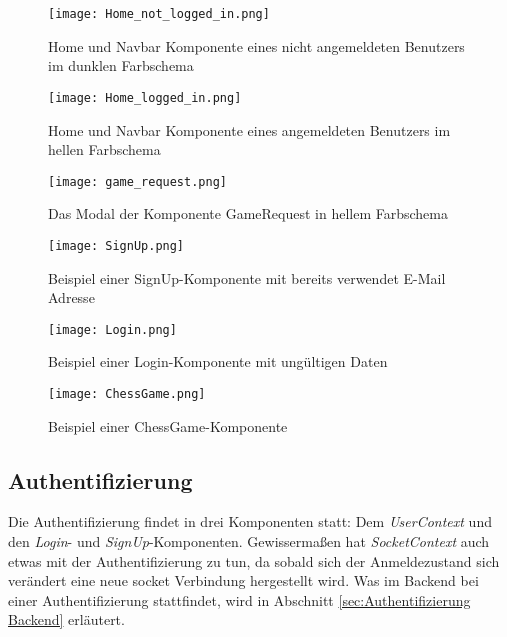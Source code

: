   \begin{figure}[htbp]
  \centering
  \texttt{[image: Home\_not\_logged\_in.png]}
  \caption{Home und Navbar Komponente eines nicht angemeldeten Benutzers im dunklen Farbschema}
  \label{fig:home-not-logged-in}
\end{figure}

  
    \begin{figure}[htbp]
    \centering
  \texttt{[image: Home\_logged\_in.png]}
  \caption{Home und Navbar Komponente eines angemeldeten Benutzers im hellen Farbschema}
  \label{fig:home-logged-in}
\end{figure}

      \begin{figure}[htbp]
      \centering
  \texttt{[image: game\_request.png]}
  \caption{Das Modal der Komponente GameRequest in hellem Farbschema}
  \label{fig:game-request}
\end{figure}

      \begin{figure}[htbp]
      \centering
  \texttt{[image: SignUp.png]}
  \caption{Beispiel einer SignUp-Komponente mit bereits verwendet E-Mail Adresse} 
  \label{fig:SignUp}
\end{figure}

      \begin{figure}[htbp]
      \centering
  \texttt{[image: Login.png]}
  \caption{Beispiel einer Login-Komponente mit ungültigen Daten} 
  \label{fig:Login}
\end{figure}

      \begin{figure}[htbp]
      \centering
  \texttt{[image: ChessGame.png]}
  \caption{Beispiel einer ChessGame-Komponente} 
  \label{fig:chess-game}
\end{figure}
        

    
   
   \subsection{Authentifizierung}
   \label{sec:Autehtifizierung Frontend}
Die Authentifizierung findet in drei Komponenten statt: Dem \textit{UserContext} und den \textit{Login}- und \textit{SignUp}-Komponenten. Gewissermaßen hat \textit{SocketContext} auch etwas mit der Authentifizierung zu tun, da sobald sich der Anmeldezustand sich verändert eine neue socket Verbindung hergestellt wird. Was im Backend bei einer Authentifizierung stattfindet, wird in Abschnitt \ref{sec:Authentifizierung Backend} erläutert.

